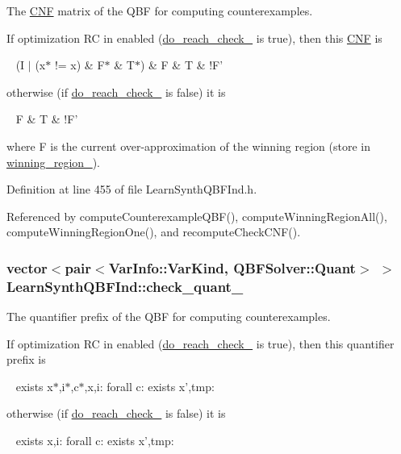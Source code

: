 The \hyperlink{classCNF}{C\-N\-F} matrix of the Q\-B\-F for computing counterexamples. 

If optimization R\-C in enabled (\hyperlink{classLearnSynthQBFInd_af87e4a2c1d17c4c5bc398082d6d3e365}{do\-\_\-reach\-\_\-check\-\_\-} is true), then this \hyperlink{classCNF}{C\-N\-F} is \par
 ~ (I $|$ (x$\ast$ != x) \& F$\ast$ \& T$\ast$) \& F \& T \& !\-F' \par
 otherwise (if \hyperlink{classLearnSynthQBFInd_af87e4a2c1d17c4c5bc398082d6d3e365}{do\-\_\-reach\-\_\-check\-\_\-} is false) it is \par
 ~ F \& T \& !\-F' \par
 where F is the current over-\/approximation of the winning region (store in \hyperlink{classLearnSynthQBFInd_ab8ce6031137413e90e0626bbdc734be0}{winning\-\_\-region\-\_\-}). 

Definition at line 455 of file Learn\-Synth\-Q\-B\-F\-Ind.\-h.



Referenced by compute\-Counterexample\-Q\-B\-F(), compute\-Winning\-Region\-All(), compute\-Winning\-Region\-One(), and recompute\-Check\-C\-N\-F().

\hypertarget{classLearnSynthQBFInd_ab9287e0b57dbf85dab6e7f7caf30cd13}{
\subsubsection[{check\-\_\-quant\-\_\-}]{\setlength{\rightskip}{0pt plus 5cm}vector$<$pair$<${\bf Var\-Info\-::\-Var\-Kind}, {\bf Q\-B\-F\-Solver\-::\-Quant}$>$ $>$ Learn\-Synth\-Q\-B\-F\-Ind\-::check\-\_\-quant\-\_\-\hspace{0.3cm}{\ttfamily [protected]}}}\label{classLearnSynthQBFInd_ab9287e0b57dbf85dab6e7f7caf30cd13}


The quantifier prefix of the Q\-B\-F for computing counterexamples. 

If optimization R\-C in enabled (\hyperlink{classLearnSynthQBFInd_af87e4a2c1d17c4c5bc398082d6d3e365}{do\-\_\-reach\-\_\-check\-\_\-} is true), then this quantifier prefix is \par
 ~ exists x$\ast$,i$\ast$,c$\ast$,x,i\-: forall c\-: exists x',tmp\-: \par
 otherwise (if \hyperlink{classLearnSynthQBFInd_af87e4a2c1d17c4c5bc398082d6d3e365}{do\-\_\-reach\-\_\-check\-\_\-} is false) it is \par
 ~ exists x,i\-: forall c\-: exists x',tmp\-: \par
 

